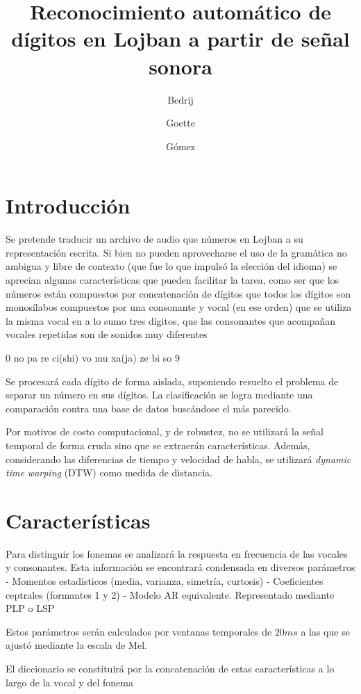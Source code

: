 \documentclass[a4paper]{article}
\title{Reconocimiento automático de dígitos en Lojban a partir de señal sonora}
\author{Bedrij \and Goette \and Gómez}
\date{}
\begin{document}
	\maketitle
	\section{Introducción}
	Se pretende traducir un archivo de audio que números en Lojban a su representación escrita.
	Si bien no pueden aprovecharse el uso de la gramática no ambigua y libre de contexto
	(que fue lo que impulsó la elección del idioma)
	se aprecian algunas características que pueden facilitar la tarea, como ser
	que los números están compuestos por concatenación de dígitos
	que todos los dígitos son monosílabos compuestos por una consonante y vocal (en ese orden)
	que se utiliza la misma vocal en a lo sumo tres dígitos, 
	que las consonantes que acompañan vocales repetidas son de sonidos muy diferentes

	0 no pa re ci(shi) vo
	mu xa(ja) ze bi so 9

	Se procesará cada dígito de forma aislada, suponiendo resuelto el problema de separar un número en sus dígitos.
	La clasificación se logra mediante una comparación contra una base de datos buscándose el más parecido.
	
	Por motivos de costo computacional, y de robustez, no se utilizará la señal temporal de forma cruda sino que se extraerán características.
	Además, considerando las diferencias de tiempo y velocidad de habla, se utilizará \emph{dynamic time warping} (DTW) como medida de distancia.

	\section{Características}
		Para distinguir los fonemas se analizará la respuesta en frecuencia de las vocales y consonantes.
		Esta información se encontrará condensada en diversos parámetros
			- Momentos estadísticos (media, varianza, simetría, curtosis)
			- Coeficientes ceptrales (formantes 1 y 2)
			- Modelo AR equivalente. Representado mediante PLP o LSP

		Estos parámetros serán calculados por ventanas temporales de $20ms$ a las que se ajustó mediante la escala de Mel.

		El diccionario se constituirá por la concatenación de estas características a lo largo de la vocal y del fonema
\end{document}
